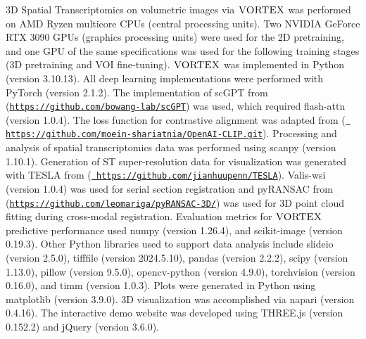 3D Spatial Transcriptomics on volumetric images via $\textsc{VORTEX}$ was performed on AMD Ryzen multicore CPUs (central processing units). Two NVIDIA GeForce RTX 3090 GPUs (graphics processing units) were used for the 2D pretraining, and one GPU of the same specifications was used for the following training stages (3D pretraining and VOI fine-tuning). $\textsc{VORTEX}$ was implemented in Python (version 3.10.13). All deep learning implementations were performed with PyTorch (version 2.1.2). The implementation of scGPT from 
(\texttt{\href{https://github.com/bowang-lab/scGPT}
{\url{https://github.com/bowang-lab/scGPT}}}) was used, which required flash-attn (version 1.0.4). The loss function for contrastive alignment was adapted from (\texttt{\href{ https://github.com/moein-shariatnia/OpenAI-CLIP.git}{\url{ https://github.com/moein-shariatnia/OpenAI-CLIP.git}}}). Processing and analysis of spatial transcriptomics data was performed using scanpy (version 1.10.1). Generation of ST super-resolution data for visualization was generated with TESLA from (\texttt{\href{https://github.com/jianhuupenn/TESLA}{\url{ https://github.com/jianhuupenn/TESLA}}}). Valis-wsi (version 1.0.4) was used for serial section registration and pyRANSAC from (\texttt{\href{https://github.com/leomariga/pyRANSAC-3D/}{\url{https://github.com/leomariga/pyRANSAC-3D/}}}) was used for 3D point cloud fitting during cross-modal registration.
Evaluation metrics for $\textsc{VORTEX}$ predictive performance used numpy (version 1.26.4), and scikit-image (version 0.19.3).
Other Python libraries used to support data analysis include slideio (version 2.5.0), tifffile (version 2024.5.10), pandas (version 2.2.2), scipy (version 1.13.0), pillow (version 9.5.0), opencv-python (version 4.9.0), torchvision (version 0.16.0), and timm (version 1.0.3). Plots were generated in Python using matplotlib (version 3.9.0). 3D visualization was accomplished via napari (version 0.4.16). The interactive demo website was developed using THREE.js (version 0.152.2) and jQuery (version 3.6.0).




